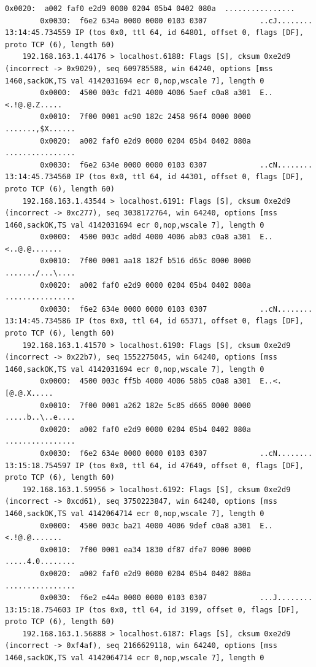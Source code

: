 \documentclass[11pt, a4paper]{article}
\begin{document}
\begin{Verbatim}[fontsize=\footnotesize,breaklines=true]
        0x0020:  a002 faf0 e2d9 0000 0204 05b4 0402 080a  ................
        0x0030:  f6e2 634a 0000 0000 0103 0307            ..cJ........
13:14:45.734559 IP (tos 0x0, ttl 64, id 64801, offset 0, flags [DF], proto TCP (6), length 60)
    192.168.163.1.44176 > localhost.6188: Flags [S], cksum 0xe2d9 (incorrect -> 0x9029), seq 609785588, win 64240, options [mss 1460,sackOK,TS val 4142031694 ecr 0,nop,wscale 7], length 0
        0x0000:  4500 003c fd21 4000 4006 5aef c0a8 a301  E..<.!@.@.Z.....
        0x0010:  7f00 0001 ac90 182c 2458 96f4 0000 0000  .......,$X......
        0x0020:  a002 faf0 e2d9 0000 0204 05b4 0402 080a  ................
        0x0030:  f6e2 634e 0000 0000 0103 0307            ..cN........
13:14:45.734560 IP (tos 0x0, ttl 64, id 44301, offset 0, flags [DF], proto TCP (6), length 60)
    192.168.163.1.43544 > localhost.6191: Flags [S], cksum 0xe2d9 (incorrect -> 0xc277), seq 3038172764, win 64240, options [mss 1460,sackOK,TS val 4142031694 ecr 0,nop,wscale 7], length 0
        0x0000:  4500 003c ad0d 4000 4006 ab03 c0a8 a301  E..<..@.@.......
        0x0010:  7f00 0001 aa18 182f b516 d65c 0000 0000  ......./...\....
        0x0020:  a002 faf0 e2d9 0000 0204 05b4 0402 080a  ................
        0x0030:  f6e2 634e 0000 0000 0103 0307            ..cN........
13:14:45.734586 IP (tos 0x0, ttl 64, id 65371, offset 0, flags [DF], proto TCP (6), length 60)
    192.168.163.1.41570 > localhost.6190: Flags [S], cksum 0xe2d9 (incorrect -> 0x22b7), seq 1552275045, win 64240, options [mss 1460,sackOK,TS val 4142031694 ecr 0,nop,wscale 7], length 0
        0x0000:  4500 003c ff5b 4000 4006 58b5 c0a8 a301  E..<.[@.@.X.....
        0x0010:  7f00 0001 a262 182e 5c85 d665 0000 0000  .....b..\..e....
        0x0020:  a002 faf0 e2d9 0000 0204 05b4 0402 080a  ................
        0x0030:  f6e2 634e 0000 0000 0103 0307            ..cN........
13:15:18.754597 IP (tos 0x0, ttl 64, id 47649, offset 0, flags [DF], proto TCP (6), length 60)
    192.168.163.1.59956 > localhost.6192: Flags [S], cksum 0xe2d9 (incorrect -> 0xcd61), seq 3750223847, win 64240, options [mss 1460,sackOK,TS val 4142064714 ecr 0,nop,wscale 7], length 0
        0x0000:  4500 003c ba21 4000 4006 9def c0a8 a301  E..<.!@.@.......
        0x0010:  7f00 0001 ea34 1830 df87 dfe7 0000 0000  .....4.0........
        0x0020:  a002 faf0 e2d9 0000 0204 05b4 0402 080a  ................
        0x0030:  f6e2 e44a 0000 0000 0103 0307            ...J........
13:15:18.754603 IP (tos 0x0, ttl 64, id 3199, offset 0, flags [DF], proto TCP (6), length 60)
    192.168.163.1.56888 > localhost.6187: Flags [S], cksum 0xe2d9 (incorrect -> 0xf4af), seq 2166629118, win 64240, options [mss 1460,sackOK,TS val 4142064714 ecr 0,nop,wscale 7], length 0

\end{Verbatim}
\end{document}
